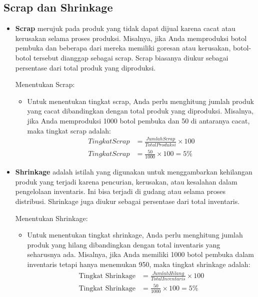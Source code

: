 \documentclass{article}
\begin{document}
\subsection{Scrap dan Shrinkage}
\begin{itemize}
    \item \textbf{Scrap} merujuk pada produk yang tidak dapat dijual karena cacat atau kerusakan selama proses produksi. Misalnya, jika Anda memproduksi botol pembuka dan beberapa dari mereka memiliki goresan atau kerusakan, botol-botol tersebut dianggap sebagai scrap. Scrap biasanya diukur sebagai persentase dari total produk yang diproduksi.

          Menentukan Scrap:
          \begin{itemize}
              \item Untuk menentukan tingkat scrap, Anda perlu menghitung jumlah produk yang cacat dibandingkan dengan total produk yang diproduksi. Misalnya, jika Anda memproduksi 1000 botol pembuka dan 50 di antaranya cacat, maka tingkat scrap adalah:
                    \begin{align*}
                        Tingkat Scrap & = \frac{Jumlah Scrap}{Total Produksi} \times 100 \\
                        Tingkat Scrap & = \frac{50}{1000} \times 100 = 5\%
                    \end{align*}

          \end{itemize}
    \item \textbf{Shrinkage} adalah istilah yang digunakan untuk menggambarkan kehilangan produk yang terjadi karena pencurian, kerusakan, atau kesalahan dalam pengelolaan inventaris. Ini bisa terjadi di gudang atau selama proses distribusi. Shrinkage juga diukur sebagai persentase dari total inventaris.

          Menentukan Shrinkage:
          \begin{itemize}
              \item Untuk menentukan tingkat shrinkage, Anda perlu menghitung jumlah produk yang hilang dibandingkan dengan total inventaris yang seharusnya ada. Misalnya, jika Anda memiliki 1000 botol pembuka dalam inventaris tetapi hanya menemukan 950, maka tingkat shrinkage adalah:
                    \begin{align*}
                        \text{Tingkat Shrinkage} & = \frac{Jumlah Hilang}{Total Inventaris} \times 100 \\
                        \text{Tingkat Shrinkage} & = \frac{50}{1000} \times 100 = 5\%
                    \end{align*}
          \end{itemize}
\end{itemize}
\end{document}
